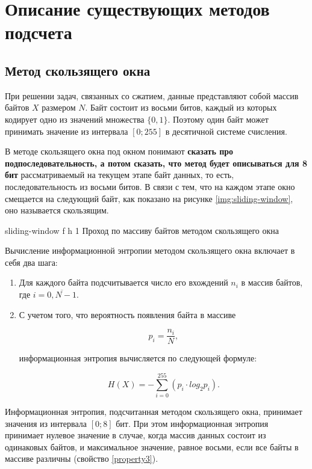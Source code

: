 \chapter{Описание существующих методов подсчета}

\section{Метод скользящего окна}

При решении задач, связанных со сжатием, данные представляют собой массив байтов $X$ размером $N$. Байт состоит из восьми битов, каждый из которых кодирует одно из значений множества $\{0, 1\}$. Поэтому один байт может принимать значение из интервала $[0; 255]$ в десятичной системе счисления. 

В методе скользящего окна \cite{sliding-window-method} под окном понимают \textbf{сказать про подпоследовательность, а потом сказать, что метод будет описываться для 8 бит} рассматриваемый на текущем этапе байт данных, то есть, последовательность из восьми битов. В связи с тем, что на каждом этапе окно смещается на следующий байт, как показано на рисунке \ref{img:sliding-window}, оно называется скользящим.

    {sliding-window}
    {f}
    {h}
    {1\textwidth}
    {Проход по массиву байтов методом скользящего окна}
    
Вычисление информационной энтропии методом скользящего окна включает в себя два шага:

\begin{enumerate}
	\item Для каждого байта подсчитывается число его вхождений $n_{i}$ в массив байтов, где $i = \overline{0, N - 1}$.
	\item С учетом того, что вероятность появления байта в массиве
	
	\begin{equation}
		p_{i} = \frac{n_{i}}{N},
	\end{equation}
	
	информационная энтропия вычисляется по следующей формуле:
	
	\begin{equation}
		H(X) = -\sum_{i = 0}^{255} (p_{i} \cdot log_{2}p_{i}).
	\end{equation}
\end{enumerate}

Информационная энтропия, подсчитанная методом скользящего окна, принимает значения из интервала $[0;8]$ бит. При этом информационная энтропия принимает нулевое значение в случае, когда массив данных состоит из одинаковых байтов, и максимальное значение, равное восьми, если все байты в массиве различны (свойство \ref{property3}).

